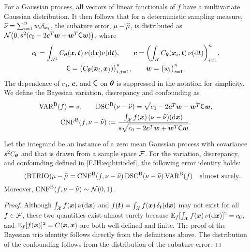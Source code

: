 \documentclass[graybox,footinfo]{svmult}
\begin{document}
For a Gaussian process, all vectors of linear functionals of $f$ have a multivariate 
Gaussian distribution.  It then follows that for a 
deterministic sampling measure, $\widehat{\nu} = \sum_{i=1}^n w_i \delta_{{\boldsymbol{x}}_i}$, the cubature 
error, $\mu - \widehat{\mu}$, is distributed as ${\mathcal{N}} \bigl(0 , s^2(c_0 - 
2 {\boldsymbol{c}}^T {\boldsymbol{w}} + {\boldsymbol{w}} ^T \mathsf{C} {\boldsymbol{w}}) \bigr)$, where 
\begin{subequations} \label{FJH:eq:Cvecmatdef}
\begin{gather}
c_0  = \int_{{\mathcal{X}}^2} C_{\boldsymbol{\theta}}({\boldsymbol{x}},{\boldsymbol{t}}) \, \nu(\mathrm{d} {\boldsymbol{x}}) \nu(\mathrm{d} {\boldsymbol{t}}), \qquad {\boldsymbol{c}} = 
\biggl( 
\int_{{\mathcal{X}}} 
C_{\boldsymbol{\theta}}({\boldsymbol{x}}_i,{\boldsymbol{t}}) \,\nu(\mathrm{d} {\boldsymbol{t}}) \biggr)_{i=1}^n, \\
\mathsf{C}  = \bigl( C_{\boldsymbol{\theta}}({\boldsymbol{x}}_i,{\boldsymbol{x}}_j) \bigr)_{i,j=1}^n, \qquad {\boldsymbol{w}} = \bigl(w_i 
\bigr)_{i=1}^n.
\end{gather}
\end{subequations}
The dependence of $c_0$, ${\boldsymbol{c}}$, and $\mathsf{C}$ on ${\boldsymbol{\theta}}$ is suppressed in the 
notation for simplicity. We 
define the Bayesian variation, discrepancy and confounding as 
\begin{subequations} \label{FJH:eq:btriodef}
\begin{gather}
\label{FJH:eq:btriodefa}
\Var^{\Ba}(f)  = s, \qquad \disc^{\Ba}(\nu - \hnu) = \sqrt{c_0 - 
	2 \bsc^T \bsw + \bsw ^T \mC \bsw},\\
\algn^{\Ba}(f,\nu - \hnu) :=\frac{ \int_{\calX} 
	f(\bsx) \, (\nu - \hnu)(\D\bsx)}{s \sqrt{c_0 - 2 \bsc^T \bsw + \bsw ^T \mC \bsw}}.
\end{gather}
\end{subequations}

\begin{theorem}  \label{FJH:thm:btrio} Let the integrand be 
an instance of a zero mean Gaussian process with covariance $s^2C_{{\boldsymbol{\theta}}}$ and 
that is drawn from a sample space 
${\mathcal{F}}$.  For the  variation, discrepancy, and 
	confounding defined in \eqref{FJH:eq:btriodef}, the following error identity holds: 
	\begin{equation} \tag{BTRIO} \label{FJH:eq:btrio}
	\mu - \hmu  = \algn^\Ba(f,\nu - \hnu) \, \disc^\Ba(\nu - \hnu) \, \Var^{\Ba}(f) \quad 
	\text{almost surely}.
	\end{equation}
	Moreover, $\textup{CNF}^{\textup{B}}(f,\nu - \widehat{\nu}) \sim {\mathcal{N}}(0,1)$. 
\end{theorem}
\begin{proof}  Although $\int_{{\mathcal{X}}} f({\boldsymbol{x}}) \, \nu(\mathrm{d} {\boldsymbol{x}})$ and $f({\boldsymbol{t}}) = \int_{{\mathcal{X}}} 
f({\boldsymbol{x}}) \, \delta_{\boldsymbol{t}} (\mathrm{d} {\boldsymbol{x}})$ may not exist for all $f \in {\mathcal{F}}$, these two quantities 
exist 
almost surely because ${\mathbb{E}}_f [\int_{{\mathcal{X}}} f({\boldsymbol{x}}) \, \nu(\mathrm{d} {\boldsymbol{x}})]^2 = c_0$, and 
${\mathbb{E}}_f [f({\boldsymbol{x}})]^2 = C({\boldsymbol{x}},{\boldsymbol{x}})$ are both well-defined and finite.  The proof of the 
Bayesian trio identity follows directly from the definitions above.  The 
distribution of the confounding follows from the distribution of the cubature error.
\end{proof}
\end{document}
